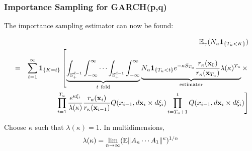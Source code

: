 \documentclass{beamer}
\begin{document}
\begin{frame}
  \frametitle{Importance Sampling for GARCH(p,q)}
  The importance sampling estimator can now be found:
  \begin{scriptsize}
    \begin{eqnarray*}
      && \mathbb{E}_\gamma (N_u \mathbf{1}_{\{T_u < K\}}) \\
      &=&
      \sum_{t=1}^\infty \mathbf{1}_{\{K=t\}}
      \left[
        \underbrace{
          \int_{\mathbb S_+^{d-1}} \int_{-\infty}^\infty
          \cdots
          \int_{\mathbb S_+^{d-1}} \int_{-\infty}^\infty
        }_{t\ \text{fold}}
        \underbrace{
          N_u \mathbf{1}_{\{T_u < t\}} e^{-\kappa S_{T_u}}
          {r_\kappa(\mathbf{x}_{0}) \over r_\kappa(\mathbf{x}_{T_u})}
          \lambda(\kappa)^{T_u}
        }_{\text{estimator}}
        \times \right.\\ 
        && \left.\prod_{i=1}^{T_u}
               {e^{\kappa \xi_i} \over \lambda(\kappa)}
               {r_\kappa(\mathbf{x}_i) \over r_\kappa(\mathbf{x}_{i-1})}
               Q(x_{i-1}, d\mathbf{x}_{i} \times d\xi_{i})
               \prod_{i=T_u+1}^{t}
               Q(x_{i-1}, d\mathbf{x}_{i} \times d\xi_{i})
               \right]
    \end{eqnarray*}
  \end{scriptsize}
  Choose $\kappa$ such that $\lambda(\kappa) = 1$. In multidimensions,
  \[
  \lambda(\kappa) = \lim_{n \to \infty} (\mathbb{E} \|A_n \cdots A_1\|^\kappa)^{1/n}
  \]
\end{frame}
\end{document}
